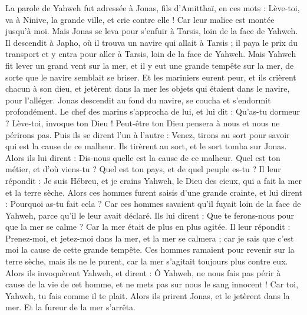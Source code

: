 \begin{multicols}{2}
\VerseOne{}La parole de Yahweh fut adressée à Jonas, fils d'Amitthaï, en ces mots :
Lève-toi, va à Ninive, la grande ville, et crie contre elle ! Car leur malice est montée jusqu'à moi.
Mais Jonas se leva pour s'enfuir à Tarsis, loin de la face de Yahweh. Il descendit à Japho, où il trouva un navire qui allait à Tarsis ; il paya le prix du transport et y entra pour aller à Tarsis, loin de la face de Yahweh.
Mais Yahweh fit lever un grand vent sur la mer, et il y eut une grande tempête sur la mer, de sorte que le navire semblait se briser.
Et les mariniers eurent peur, et ils crièrent chacun à son dieu, et jetèrent dans la mer les objets qui étaient dans le navire, pour l’alléger. Jonas descendit au fond du navire, se coucha et s’endormit profondément.
Le chef des marins s'approcha de lui, et lui dit : Qu’as-tu dormeur ? Lève-toi, invoque ton Dieu ! Peut-être ton Dieu pensera à nous et nous ne périrons pas.
Puis ils se dirent l'un à l'autre : Venez, tirons au sort pour savoir qui est la cause de ce malheur. Ils tirèrent au sort, et le sort tomba sur Jonas.
Alors ils lui dirent : Dis-nous quelle est la cause de ce malheur. Quel est ton métier, et d'où viens-tu ? Quel est ton pays, et de quel peuple es-tu ?
Il leur répondit : Je suis Hébreu, et je crains Yahweh, le Dieu des cieux, qui a fait la mer et la terre sèche.
Alors ces hommes furent saisis d'une grande crainte, et lui dirent : Pourquoi as-tu fait cela ? Car ces hommes savaient qu’il fuyait loin de la face de Yahweh, parce qu'il le leur avait déclaré.
Ils lui dirent : Que te ferons-nous pour que la mer se calme ? Car la mer était de plus en plus agitée.
Il leur répondit : Prenez-moi, et jetez-moi dans la mer, et la mer se calmera ; car je sais que c’est moi la cause de cette grande tempête.
Ces hommes ramaient pour revenir sur la terre sèche, mais ils ne le purent, car la mer s'agitait toujours plus contre eux.
Alors ils invoquèrent Yahweh, et dirent : Ô Yahweh, ne nous fais pas périr à cause de la vie de cet homme, et ne mets pas sur nous le sang innocent ! Car toi, Yahweh, tu fais comme il te plait.
Alors ils prirent Jonas, et le jetèrent dans la mer. Et la fureur de la mer s'arrêta.

\end{multicols}

